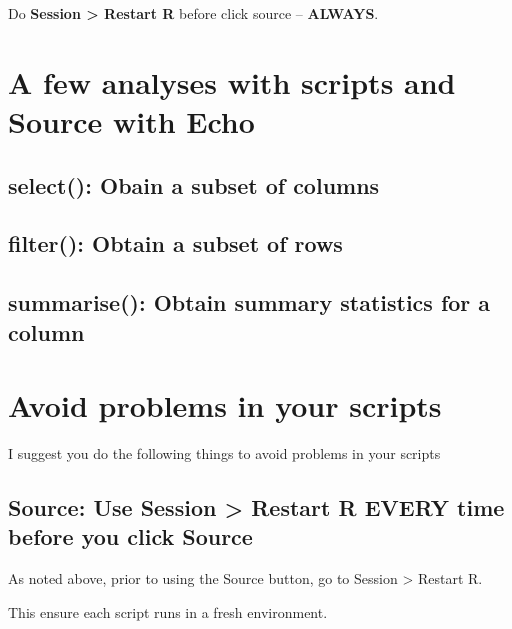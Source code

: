 \documentclass[
]{krantz}
\begin{document}
Do \textbf{Session \textgreater{} Restart R} before click source -- \textbf{ALWAYS}.

\hypertarget{a-few-analyses-with-scripts-and-source-with-echo}{%
\section{A few analyses with scripts and Source with Echo}\label{a-few-analyses-with-scripts-and-source-with-echo}}

\hypertarget{select-obain-a-subset-of-columns}{%
\subsection{select(): Obain a subset of columns}\label{select-obain-a-subset-of-columns}}

\hypertarget{filter-obtain-a-subset-of-rows}{%
\subsection{filter(): Obtain a subset of rows}\label{filter-obtain-a-subset-of-rows}}

\hypertarget{summarise-obtain-summary-statistics-for-a-column}{%
\subsection{summarise(): Obtain summary statistics for a column}\label{summarise-obtain-summary-statistics-for-a-column}}

\hypertarget{avoid-problems-in-your-scripts}{%
\section{Avoid problems in your scripts}\label{avoid-problems-in-your-scripts}}

I suggest you do the following things to avoid problems in your scripts

\hypertarget{source-use-session-restart-r-every-time-before-you-click-source-1}{%
\subsection{Source: Use Session \textgreater{} Restart R EVERY time before you click Source}\label{source-use-session-restart-r-every-time-before-you-click-source-1}}

As noted above, prior to using the Source button, go to Session \textgreater{} Restart R.

This ensure each script runs in a fresh environment.
\end{document}
